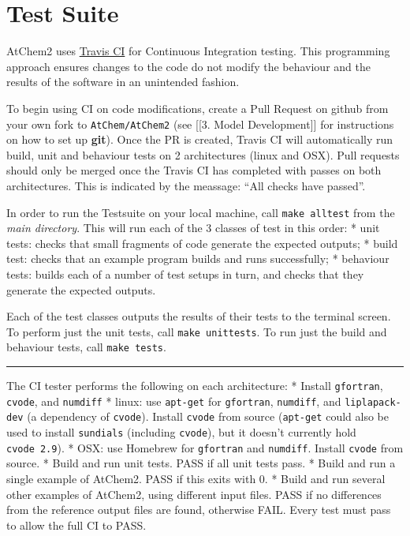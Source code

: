 \chapter{Test Suite}

AtChem2 uses \href{https://travis-ci.org/}{Travis CI} for Continuous
Integration testing. This programming approach ensures changes to the
code do not modify the behaviour and the results of the software in an
unintended fashion.

To begin using CI on code modifications, create a Pull Request on github
from your own fork to \texttt{AtChem/AtChem2} (see {[}{[}3. Model
Development{]}{]} for instructions on how to set up \textbf{git}). Once
the PR is created, Travis CI will automatically run build, unit and
behaviour tests on 2 architectures (linux and OSX). Pull requests should
only be merged once the Travis CI has completed with passes on both
architectures. This is indicated by the meassage: ``All checks have
passed''.

In order to run the Testsuite on your local machine, call
\texttt{make\ alltest} from the \emph{main directory}. This will run
each of the 3 classes of test in this order: * unit tests: checks that
small fragments of code generate the expected outputs; * build test:
checks that an example program builds and runs successfully; * behaviour
tests: builds each of a number of test setups in turn, and checks that
they generate the expected outputs.

Each of the test classes outputs the results of their tests to the
terminal screen. To perform just the unit tests, call
\texttt{make\ unittests}. To run just the build and behaviour tests,
call \texttt{make\ tests}.

\begin{center}\rule{0.5\linewidth}{\linethickness}\end{center}

The CI tester performs the following on each architecture: * Install
\texttt{gfortran}, \texttt{cvode}, and \texttt{numdiff} * linux: use
\texttt{apt-get} for \texttt{gfortran}, \texttt{numdiff}, and
\texttt{liplapack-dev} (a dependency of \texttt{cvode}). Install
\texttt{cvode} from source (\texttt{apt-get} could also be used to
install \texttt{sundials} (including \texttt{cvode}), but it doesn't
currently hold \texttt{cvode\ 2.9}). * OSX: use Homebrew for
\texttt{gfortran} and \texttt{numdiff}. Install \texttt{cvode} from
source. * Build and run unit tests. PASS if all unit tests pass. * Build
and run a single example of AtChem2. PASS if this exits with 0. * Build
and run several other examples of AtChem2, using different input files.
PASS if no differences from the reference output files are found,
otherwise FAIL. Every test must pass to allow the full CI to PASS.

